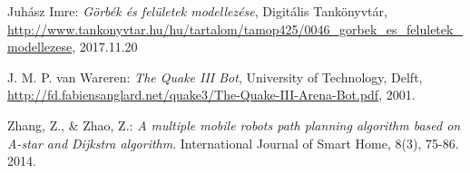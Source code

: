 \begin{thebibliography}{x}
Juhász Imre: \emph{Görbék és felületek modellezése}, Digitális Tankönyvtár, \\
\url{http://www.tankonyvtar.hu/hu/tartalom/tamop425/0046_gorbek_es_feluletek_modellezese}, 2017.11.20

J. M. P. van Wareren: \emph{The Quake III Bot}, University of Technology, Delft, \\
\url{http://fd.fabiensanglard.net/quake3/The-Quake-III-Arena-Bot.pdf}, 2001.

Zhang, Z., \& Zhao, Z.: \emph{A multiple mobile robots path planning algorithm based on A-star and Dijkstra algorithm}. International Journal of Smart Home, 8(3), 75-86. 2014.

\end{thebibliography}
